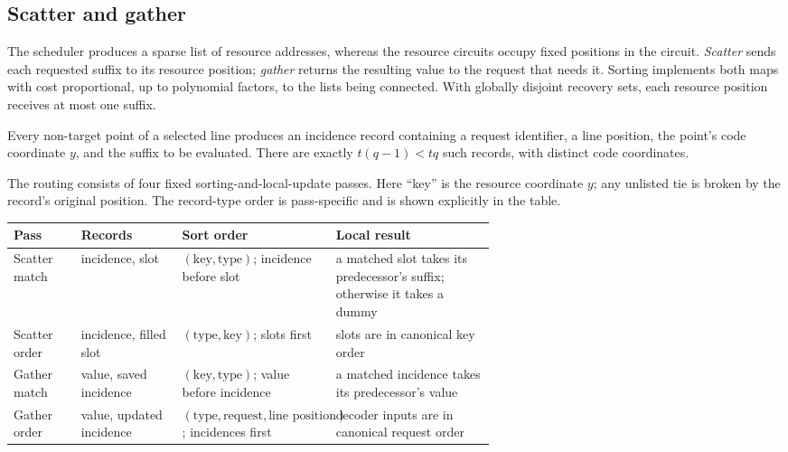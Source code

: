 \documentclass[11pt]{article}
\begin{document}
\subsection{Scatter and gather}

The scheduler produces a sparse list of resource addresses, whereas the
resource circuits occupy fixed positions in the circuit.  \emph{Scatter}
sends each requested suffix to its resource position; \emph{gather} returns
the resulting value to the request that needs it.  Sorting implements both
maps with cost proportional, up to polynomial factors, to the lists being
connected.  With globally disjoint recovery sets, each resource position
receives at most one suffix.

Every non-target point of a selected line produces an incidence record
containing a request identifier, a line position, the point's code
coordinate $y$, and the suffix to be evaluated.  There are exactly
$t(q-1)<tq$ such records, with distinct code coordinates.

The routing consists of four fixed sorting-and-local-update passes.  Here
``key'' is the resource coordinate $y$; any unlisted tie is broken by the record's
original position.  The record-type order is pass-specific and is shown
explicitly in the table.
\begin{center}
\small
\begin{tabularx}{\linewidth}{@{}
  >{\raggedright\arraybackslash}p{0.14\linewidth}
  >{\raggedright\arraybackslash}p{0.21\linewidth}
  >{\raggedright\arraybackslash}p{0.27\linewidth}
  >{\raggedright\arraybackslash}X@{}}
\toprule
Pass & Records & Sort order & Local result \\
\midrule
Scatter match
  & incidence, slot
  & $(\text{key},\text{type})$; incidence before slot
  & a matched slot takes its predecessor's suffix; otherwise it takes a dummy \\
Scatter order
  & incidence, filled slot
  & $(\text{type},\text{key})$; slots first
  & slots are in canonical key order \\
Gather match
  & value, saved incidence
  & $(\text{key},\text{type})$; value before incidence
  & a matched incidence takes its predecessor's value \\
Gather order
  & value, updated incidence
  & $(\text{type},\text{request},\text{line position})$; incidences first
  & decoder inputs are in canonical request order \\
\bottomrule
\end{tabularx}
\end{center}
\end{document}
